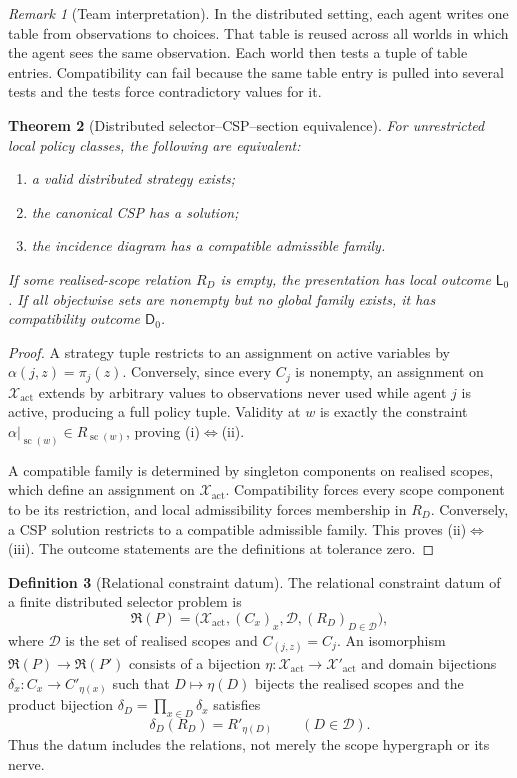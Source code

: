 \documentclass[11pt]{article}
\theoremstyle{plain}
\newtheorem{theorem}{Theorem}[section]
\theoremstyle{definition}
\newtheorem{definition}[theorem]{Definition}
\theoremstyle{remark}
\newtheorem{remark}[theorem]{Remark}
\begin{document}
\begin{remark}[Team interpretation]
In the distributed setting, each agent writes one table from observations to
choices. That table is reused across all worlds in which the agent sees the same
observation. Each world then tests a tuple of table entries. Compatibility can
fail because the same table entry is pulled into several tests and the tests
force contradictory values for it.
\end{remark}

\begin{theorem}[Distributed selector--CSP--section equivalence]
\label{thm:distributed-equivalence}
For unrestricted local policy classes, the following are equivalent:
\begin{enumerate}[label=(\roman*)]
\item a valid distributed strategy exists;
\item the canonical CSP has a solution;
\item the incidence diagram has a compatible admissible family.
\end{enumerate}
If some realised-scope relation $R_D$ is empty, the presentation has local
outcome $\mathsf L_0$. If all objectwise sets are nonempty but no global family
exists, it has compatibility outcome $\mathsf D_0$.
\end{theorem}

\begin{proof}
A strategy tuple restricts to an assignment on active variables by
$\alpha(j,z)=\pi_j(z)$. Conversely, since every $C_j$ is nonempty, an assignment
on $\mathcal X_{\mathrm{act}}$ extends by arbitrary values to observations never
used while agent $j$ is active, producing a full policy tuple. Validity at $w$
is exactly the constraint
$\alpha|_{\operatorname{sc}(w)}\in R_{\operatorname{sc}(w)}$, proving
(i)$\Leftrightarrow$(ii).

A compatible family is determined by singleton components on realised scopes,
which define an assignment on $\mathcal X_{\mathrm{act}}$. Compatibility forces
every scope component to be its restriction, and local admissibility forces
membership in $R_D$. Conversely, a CSP solution restricts to a compatible
admissible family. This proves (ii)$\Leftrightarrow$(iii). The outcome statements
are the definitions at tolerance zero.
\end{proof}


\begin{definition}[Relational constraint datum]\label{def:constraint-datum}
The relational constraint datum of a finite distributed selector problem is
\[
\mathfrak R(P)=
\bigl(\mathcal X_{\mathrm{act}},(C_x)_x,
\mathcal D,(R_D)_{D\in\mathcal D}\bigr),
\]
where $\mathcal D$ is the set of realised scopes and $C_{(j,z)}=C_j$.
An isomorphism $\mathfrak R(P)\to\mathfrak R(P')$ consists of a bijection
$\eta:\mathcal X_{\mathrm{act}}\to\mathcal X'_{\mathrm{act}}$ and domain
bijections $\delta_x:C_x\to C'_{\eta(x)}$ such that
$D\mapsto\eta(D)$ bijects the realised scopes and the product bijection
$\delta_D=\prod_{x\in D}\delta_x$ satisfies
\[
\delta_D(R_D)=R'_{\eta(D)}
\qquad(D\in\mathcal D).
\]
Thus the datum includes the relations, not merely the scope hypergraph or its
nerve.
\end{definition}
\end{document}
